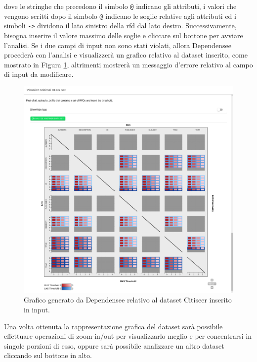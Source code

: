 dove le stringhe che precedono il simbolo \texttt{@} indicano gli attributi, i valori che vengono scritti dopo il simbolo \texttt{@} indicano le soglie relative agli attributi ed i simboli \texttt{->} dividono il lato sinistro della \acrshort{rfd} dal lato destro. Successivamente, bisogna inserire il valore massimo delle soglie e cliccare sul bottone per avviare l'analisi. Se i due campi di input non sono stati violati, allora Dependensee proceder\`{a} con l'analisi e visualizzer\`{a} un grafico relativo al dataset inserito, come mostrato in Figura \ref{fig:dependensee_dataset_analyzed}, altrimenti mostrer\`{a} un messaggio d'errore relativo al campo di input da modificare.
\begin{figure}[ht]
    \centering
    \includegraphics[width=\linewidth]{capitoli/figure/dependensee_analyzed_screen}
    \caption{Grafico generato da Dependensee relativo al dataset Citiseer inserito in input.}
    \label{fig:dependensee_dataset_analyzed}
\end{figure}
Una volta ottenuta la rappresentazione grafica del dataset sar\`{a} possibile effettuare operazioni di zoom-in/out per visualizzarlo meglio e per concentrarsi in singole porzioni di esso, oppure sar\`{a} possibile analizzare un altro dataset cliccando sul bottone in alto.

